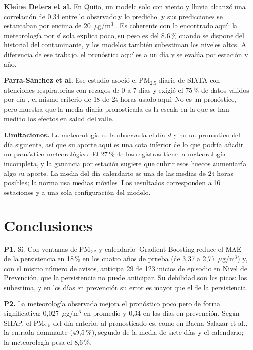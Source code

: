 \documentclass[conference]{IEEEtran}
\begin{document}
\textbf{Kleine Deters et al.} En Quito, un modelo solo con viento y
lluvia alcanzó una correlación de 0,34 entre lo observado y lo predicho, y
sus predicciones se estancaban por encima de 20~$\mu$g/m$^3$
\cite{kleine2017modeling}. Es coherente con lo encontrado aquí: la
meteorología por sí sola explica poco, su peso es del 8,6\,\% cuando se
dispone del historial del contaminante, y los modelos también subestiman
los niveles altos. A diferencia de ese trabajo, el pronóstico aquí es a un
día y se evalúa por estación y año.

\textbf{Parra-Sánchez et al.} Ese estudio asoció el PM$_{2.5}$ diario de
SIATA con atenciones respiratorias con rezagos de 0 a 7 días y exigió el
75\,\% de datos válidos por día \cite{parra2020analitica}, el mismo
criterio de 18 de 24 horas usado aquí. No es un pronóstico, pero muestra
que la media diaria pronosticada es la escala en la que se han medido los
efectos en salud del valle.

\textbf{Limitaciones.} La meteorología es la observada el día $d$ y no un
pronóstico del día siguiente, así que su aporte aquí es una cota inferior
de lo que podría añadir un pronóstico meteorológico. El 27\,\% de los
registros tiene la meteorología incompleta, y la ganancia por estación
sugiere que cubrir esos huecos aumentaría algo su aporte. La media del día
calendario es una de las medias de 24 horas posibles; la norma usa medias
móviles. Los resultados corresponden a 16 estaciones y a una sola
configuración del modelo.


\section{Conclusiones}
\label{sec:conclusiones}

\textbf{P1.} Sí. Con ventanas de PM$_{2.5}$ y calendario, Gradient
Boosting reduce el MAE de la persistencia en 18\,\% en los cuatro años de
prueba (de 3,37 a 2,77~$\mu$g/m$^3$) y, con el mismo número de avisos,
anticipa 29 de 123 inicios de episodio en Nivel de Prevención, que la
persistencia no puede anticipar. Su debilidad son los picos: los
subestima, y en los días en prevención su error es mayor que el de la
persistencia.

\textbf{P2.} La meteorología observada mejora el pronóstico poco pero de
forma significativa: 0,027~$\mu$g/m$^3$ en promedio y 0,34 en los días en
prevención. Según SHAP, el PM$_{2.5}$ del día anterior al pronosticado es,
como en Baena-Salazar et al., la entrada dominante (49,5\,\%), seguido de
la media de siete días y el calendario; la meteorología pesa el 8,6\,\%.
\end{document}

